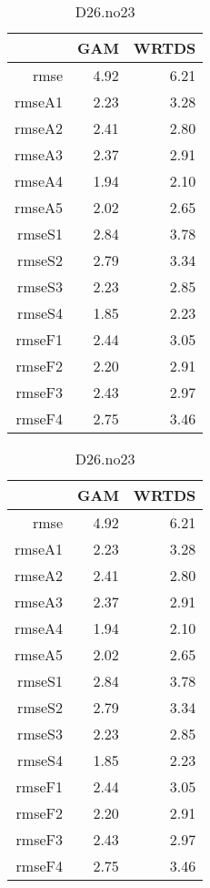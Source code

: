 \documentclass[12pt]{amsart}
\begin{document}
\begin{table}[H]
\centering
\begin{tabular}{rrr}
  \hline
 & GAM & WRTDS \\ 
  \hline
rmse & 4.92 & 6.21 \\ 
  rmseA1 & 2.23 & 3.28 \\ 
  rmseA2 & 2.41 & 2.80 \\ 
  rmseA3 & 2.37 & 2.91 \\ 
  rmseA4 & 1.94 & 2.10 \\ 
  rmseA5 & 2.02 & 2.65 \\ 
  rmseS1 & 2.84 & 3.78 \\ 
  rmseS2 & 2.79 & 3.34 \\ 
  rmseS3 & 2.23 & 2.85 \\ 
  rmseS4 & 1.85 & 2.23 \\ 
  rmseF1 & 2.44 & 3.05 \\ 
  rmseF2 & 2.20 & 2.91 \\ 
  rmseF3 & 2.43 & 2.97 \\ 
  rmseF4 & 2.75 & 3.46 \\ 
   \hline
\end{tabular}
\caption{D26.no23}
\end{table}

\begin{table}[H]
\centering
\begin{tabular}{rrr}
  \hline
 & GAM & WRTDS \\ 
  \hline
rmse & 4.92 & 6.21 \\ 
  rmseA1 & 2.23 & 3.28 \\ 
  rmseA2 & 2.41 & 2.80 \\ 
  rmseA3 & 2.37 & 2.91 \\ 
  rmseA4 & 1.94 & 2.10 \\ 
  rmseA5 & 2.02 & 2.65 \\ 
  rmseS1 & 2.84 & 3.78 \\ 
  rmseS2 & 2.79 & 3.34 \\ 
  rmseS3 & 2.23 & 2.85 \\ 
  rmseS4 & 1.85 & 2.23 \\ 
  rmseF1 & 2.44 & 3.05 \\ 
  rmseF2 & 2.20 & 2.91 \\ 
  rmseF3 & 2.43 & 2.97 \\ 
  rmseF4 & 2.75 & 3.46 \\ 
   \hline
\end{tabular}
\caption{D26.no23}
\end{table}
\end{document}

